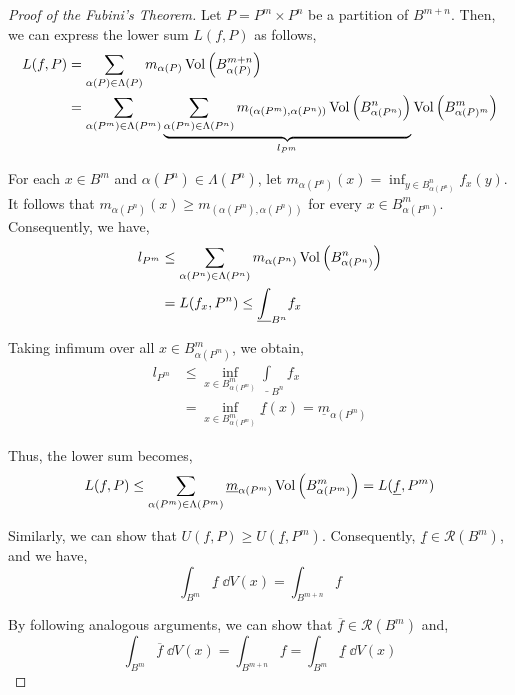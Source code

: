 \documentclass[../Analysis-3.tex]{subfiles}
\begin{document}
\begin{proof}[Proof of the Fubini's Theorem]
  Let $P = P^m \times P^n$ be a partition of $B^{m+n}$. Then, we can express the lower sum $L(f,P)$ as follows,
  \begin{align*}
    L(f,P) & = \sum_{\alpha(P) \in \Lambda(P)} m_{\alpha(P)} \operatorname{Vol}\left( B_{\alpha(P)}^{m+n} \right)                                                                                                                        \\
           & = \sum_{\alpha(P^m) \in \Lambda(P^m)} \underbrace{\sum_{\alpha(P^n) \in \Lambda(P^n)} m_{(\alpha(P^m), \alpha(P^n))} \operatorname{Vol}\left( B_{\alpha(P^n)}^{n} \right)}_{l_{P^m}} \operatorname{Vol}\left( B_{\alpha(P)^m}^{m} \right)
  \end{align*}

  For each $x \in B^m$ and $\alpha(P^n) \in \Lambda(P^n)$, let $m_{\alpha(P^n)}(x) = \inf_{y \in B_{\alpha(P^n)}^n} f_x(y)$. It follows that $m_{\alpha(P^n)}(x) \geq m_{(\alpha(P^m), \alpha(P^n))}$ for every $x \in B_{\alpha(P^m)}^m$. Consequently, we have,
  \begin{align*}
    l_{P^m}
     & \leq \sum_{\alpha(P^n) \in \Lambda(P^n)} m_{\alpha(P^n)} \operatorname{Vol}\left( B_{\alpha(P^n)}^n \right) \\
     & = L(f_x, P^n) \leq \underline{\int}_{B^n} f_x                                                 \\
  \end{align*}

  Taking infimum over all $ x \in B_{\alpha(P^m)}^m $, we obtain,
  \begin{align*}
    l_{P^m}
     & \leq \inf_{x \in B_{\alpha(P^m)}^m} \underline{\int}_{B^n} f_x                  \\
     & = \inf_{x \in B_{\alpha(P^m)}^m} \underline{f}(x) = \underline{m}_{\alpha(P^m)}
  \end{align*}

  Thus, the lower sum becomes,
  \[  L(f,P) \leq \sum_{\alpha(P^m) \in \Lambda(P^m)} \underline{m}_{\alpha(P^m)} \operatorname{Vol}\left( B_{\alpha(P^m)}^m \right) = L(\underline{f},P^m)  \]

  Similarly, we can show that $U(f,P) \geq U(\underline{f},P^m)$. Consequently, $\underline{f} \in \mathscr{R}(B^m)$, and we have,
  \[  \int_{B^m} \underline{f} \; \dd{V(x)} = \int_{B^{m+n}} f  \]

  By following analogous arguments, we can show that $\overline{f} \in \mathscr{R}(B^m)$ and,
  \[  \int_{B^m} \overline{f} \; \dd{V(x)} = \int_{B^{m+n}} f = \int_{B^m} \underline{f} \; \dd{V(x)}  \]
\end{proof}
\end{document}
